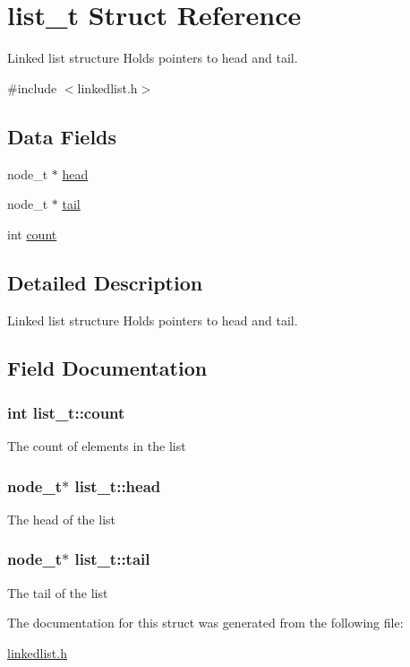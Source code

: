 \hypertarget{structlist}{\section{list\+\_\+t Struct Reference}
\label{structlist}
}


Linked list structure Holds pointers to head and tail.  




{\ttfamily \#include $<$linkedlist.\+h$>$}

\subsection*{Data Fields}
\begin{DoxyCompactItemize}
\item 
node\+\_\+t $\ast$ \hyperlink{structlist_a41ca53f3f5a14b999af80b8332137ca2}{head}
\item 
node\+\_\+t $\ast$ \hyperlink{structlist_aba8e9dd90ba0dc731f3e9efa8d2c8354}{tail}
\item 
int \hyperlink{structlist_acf344905df71c798f746ed947b6a6567}{count}
\end{DoxyCompactItemize}


\subsection{Detailed Description}
Linked list structure Holds pointers to head and tail. 

\subsection{Field Documentation}
\hypertarget{structlist_acf344905df71c798f746ed947b6a6567}{
\subsubsection[{count}]{\setlength{\rightskip}{0pt plus 5cm}int list\+\_\+t\+::count}}\label{structlist_acf344905df71c798f746ed947b6a6567}
The count of elements in the list \hypertarget{structlist_a41ca53f3f5a14b999af80b8332137ca2}{
\subsubsection[{head}]{\setlength{\rightskip}{0pt plus 5cm}node\+\_\+t$\ast$ list\+\_\+t\+::head}}\label{structlist_a41ca53f3f5a14b999af80b8332137ca2}
The head of the list \hypertarget{structlist_aba8e9dd90ba0dc731f3e9efa8d2c8354}{
\subsubsection[{tail}]{\setlength{\rightskip}{0pt plus 5cm}node\+\_\+t$\ast$ list\+\_\+t\+::tail}}\label{structlist_aba8e9dd90ba0dc731f3e9efa8d2c8354}
The tail of the list 

The documentation for this struct was generated from the following file\+:\begin{DoxyCompactItemize}
\item 
\hyperlink{linkedlist_8h}{linkedlist.\+h}\end{DoxyCompactItemize}
